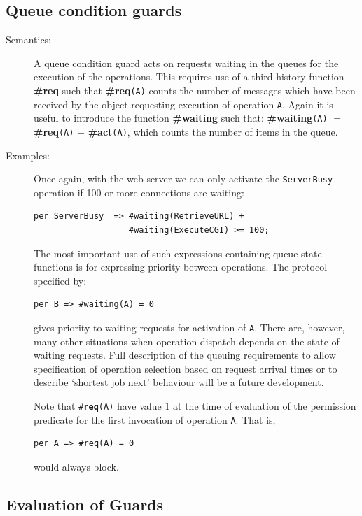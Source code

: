 \documentclass{overturerepchap}
\newcommand{\keyw}[1]{{\bf\ttfamily #1}}
\begin{document}
\subsection{Queue condition guards}\label{queuesec}
\begin{description}
\item[Semantics:] 
A queue condition guard acts on requests waiting in the queues for the
execution of the operations.
This requires use of a third history function {\bf\ttfamily \#req} such that
{\bf\ttfamily \#req}{\tt (A)} counts the number of messages which have been received by the
object requesting execution of operation {\tt A}.
Again it is useful to introduce the function {\bf\ttfamily \#waiting} such that:
{\bf\ttfamily \#waiting}{\tt (A}{\tt )} $=$ {\bf\ttfamily \#req}{\tt (A}{\tt )} $-$ {\bf\ttfamily \#act}{\tt (A}{\tt )},
which counts the number of items in the queue.

\item[Examples:] 
Once again, with the web server we can only activate the
\texttt{ServerBusy} operation if 100 or more connections are waiting:
\begin{lstlisting}
per ServerBusy  => #waiting(RetrieveURL) +
                   #waiting(ExecuteCGI) >= 100;
\end{lstlisting}

The most important use of such expressions containing queue
state functions is for expressing priority between operations. The
protocol specified by:
\begin{lstlisting}
per B => #waiting(A) = 0
\end{lstlisting}
gives priority to waiting  requests for activation of {\tt A}. There
are, however, many other situations when operation dispatch depends on
the state of waiting requests.  Full description of the queuing
requirements to allow specification of operation selection based on
request arrival times or to describe `shortest job next' behaviour
will be a future development.

Note that \texttt{\#\keyw{req}(A)} have value 1 at the time of evaluation of
the permission predicate for the first invocation of operation
\texttt{A}. That is,
\begin{lstlisting}
per A => #req(A) = 0
\end{lstlisting}
would always block.

\end{description}

\subsection{Evaluation of Guards}
\end{document}
